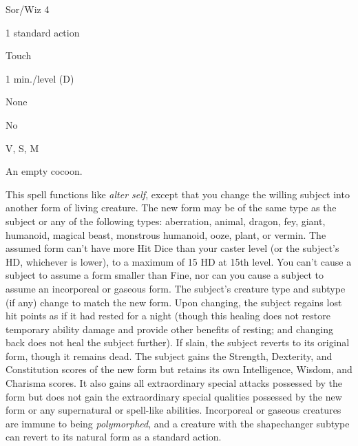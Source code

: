 
\begin{description*}
\item[Level:] Sor/Wiz 4
\item[Casting Time:] 1 standard action
\item[Range:] Touch
\item[Duration:] 1 min./level (D)
\item[Saving Throw:] None
\item[Spell Resistance:] No
\item[Components:] V, S, M
\item[Arcane Material Component:] An empty cocoon.
\end{description*}

This spell functions like \textit{alter self}, except that you change the willing
subject into another form of living creature. The new form may be of the same type
as the subject or any of the following types: aberration, animal, dragon, fey,
giant, humanoid, magical beast, monstrous humanoid, ooze, plant, or vermin. The
assumed form can't have more Hit Dice than your caster level (or the subject's
HD, whichever is lower), to a maximum of 15 HD at 15th level. You can't cause a
subject to assume a form smaller than Fine, nor can you cause a subject to assume
an incorporeal or gaseous form. The subject's creature type and subtype (if any)
change to match the new form.
Upon changing, the subject regains lost hit points as if it had rested for a night
(though this healing does not restore temporary ability damage and provide other
benefits of resting; and changing back does not heal the subject further). If slain,
the subject reverts to its original form, though it remains dead.
The subject gains the Strength, Dexterity, and Constitution scores of the new form
but retains its own Intelligence, Wisdom, and Charisma scores. It also gains all
extraordinary special attacks possessed by the form but does not gain the extraordinary
special qualities possessed by the new form or any supernatural or spell-like abilities.
Incorporeal or gaseous creatures are immune to being \textit{polymorphed}, and
a creature with the shapechanger subtype can revert to its natural form as a standard
action.